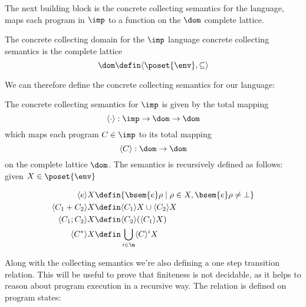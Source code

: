 The next building block is the concrete collecting semantics for the
language, maps each program in \(\imp\) to a function on the \(\dom\)
complete lattice.

\begin{definition}
  The concrete collecting domain for the \(\imp\) language concrete
  collecting semantics is the complete lattice \[\dom \defin \langle
  \poset{\env} , \subseteq \rangle \]
\end{definition}

We can therefore define the concrete collecting semantics for our
language:

\begin{definition}
  The concrete collecting semantics for \(\imp\) is given by the total
  mapping \[\langle \cdot \rangle : \imp \to \dom \to \dom\] which
  maps each program \(C \in \imp\) to its total mapping \[\langle C
  \rangle : \dom \to \dom\] on the complete lattice \(\dom\). The
  semantics is recursively defined as follows: given \(X \in \poset{\env}\)

  \begin{align*}
    \langle e \rangle X & \defin \{\bsem{ e} \rho \mid \rho \in X,
    \bsem{ e} \rho \neq \bot\} \\
    \langle C_1 + C_2 \rangle X & \defin \langle C_1 \rangle X \cup
    \langle C_2 \rangle X \\
    \langle C_1 ; C_2 \rangle X & \defin \langle C_2 \rangle (\langle
    C_1 \rangle X) \\
    \langle C^* \rangle X & \defin \bigcup_{i \in \n} \langle C \rangle^i X
  \end{align*}
\end{definition}


Along with the collecting semantics we're also defining a one step
transition relation. This will be useful to prove that finiteness is
not decidable, as it helps to reason about program execution in a
recursive way. The relation is defined on program states:

